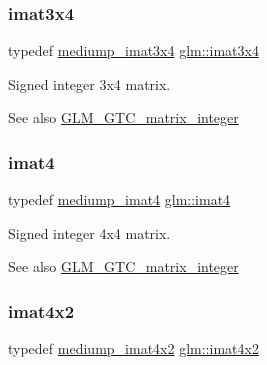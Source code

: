 \subsubsection{\texorpdfstring{imat3x4}{imat3x4}}
{\footnotesize\ttfamily typedef \hyperlink{group__gtc__matrix__integer_ga721a754fc35cc5ac097e331d893a6b2c}{mediump\+\_\+imat3x4} \hyperlink{group__gtc__matrix__integer_gaee5507e6cbbdd05841a0c174e60dd036}{glm\+::imat3x4}}

Signed integer 3x4 matrix. \begin{DoxySeeAlso}{See also}
\hyperlink{group__gtc__matrix__integer}{G\+L\+M\+\_\+\+G\+T\+C\+\_\+matrix\+\_\+integer} 
\end{DoxySeeAlso}
\mbox{\label{group__gtc__matrix__integer_ga40fc5c5e0b07543497aa1c314891544a}} 
\subsubsection{\texorpdfstring{imat4}{imat4}}
{\footnotesize\ttfamily typedef \hyperlink{group__gtc__matrix__integer_ga680c97868de08658ca4924718d951def}{mediump\+\_\+imat4} \hyperlink{group__gtc__matrix__integer_ga40fc5c5e0b07543497aa1c314891544a}{glm\+::imat4}}

Signed integer 4x4 matrix. \begin{DoxySeeAlso}{See also}
\hyperlink{group__gtc__matrix__integer}{G\+L\+M\+\_\+\+G\+T\+C\+\_\+matrix\+\_\+integer} 
\end{DoxySeeAlso}
\mbox{\label{group__gtc__matrix__integer_ga7e733984837e0e7aa9f4aac18f632f63}} 
\subsubsection{\texorpdfstring{imat4x2}{imat4x2}}
{\footnotesize\ttfamily typedef \hyperlink{group__gtc__matrix__integer_gabfe107153637dfd7a0c272ff1ba892ed}{mediump\+\_\+imat4x2} \hyperlink{group__gtc__matrix__integer_ga7e733984837e0e7aa9f4aac18f632f63}{glm\+::imat4x2}}

